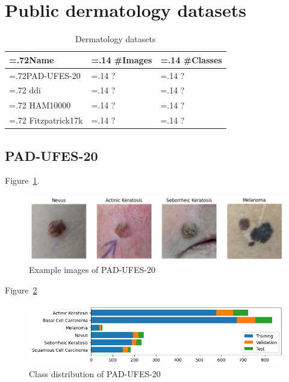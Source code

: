 \section{Public dermatology datasets}
\label{section:derma_datasets}

\begin{table}[H]
\centering
\caption{Dermatology datasets\label{tab:suitable_derma_datasets}}
\begin{tabularx}{\textwidth}{|
    >{\hsize=.72\hsize}X |
    >{\hsize=.14\hsize\raggedleft}X |
    >{\hsize=.14\hsize\raggedleft}X |
}
\hline
\textbf{Name} & \textbf{\#Images} & \textbf{\#Classes} \tabularnewline \hline
PAD-UFES-20 \autocite{hslu} & ? & ? \tabularnewline \hline
\gls{ddi} \autocite{hslu} & ? & ? \tabularnewline \hline
HAM10000 \autocite{hslu} & ? & ? \tabularnewline \hline
Fitzpatrick17k \autocite{hslu} & ? & ? \tabularnewline \hline
\end{tabularx}
\end{table}

\subsection{PAD-UFES-20}
Figure~\ref{fig:example_images_of_pad-ufes-20}.

\begin{figure}[H]
    \begin{center}
    \includegraphics[width=15cm]{../images/example_images_of_pad-ufes-20.png}
    \caption{Example images of PAD-UFES-20}
   \label{fig:example_images_of_pad-ufes-20}
    \end{center}
\end{figure}

Figure~\ref{fig:class_distribution_of_pad-ufes-20}

\begin{figure}[H]
    \begin{center}
    \includegraphics[width=15cm]{../images/class_distribution_of_pad-ufes-20.png}
    \caption{Class distribution of PAD-UFES-20}
   \label{fig:class_distribution_of_pad-ufes-20}
    \end{center}
\end{figure}
